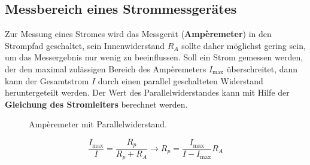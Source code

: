 \subsection{Messbereich eines Strommessgerätes}
Zur Messung eines Stromes wird das Messgerät (\textbf{Ampèremeter}) in den Strompfad geschaltet, sein Innenwiderstand $R_A$ sollte daher möglichst gering sein, um das Messergebnis nur wenig zu beeinflussen. Soll ein Strom gemessen werden, der den maximal zulässigen Bereich des Ampèremeters $I_{\text{max}}$ überschreitet, dann kann der Gesamtstrom $I$ durch einen parallel geschalteten Widerstand heruntergeteilt werden. Der Wert des Parallelwiderstandes kann mit Hilfe der \textbf{Gleichung des Stromleiters} berechnet werden.
\begin{figure}[H]
\centering
\caption{Ampèremeter mit Parallelwiderstand.}
\label{fig_IIIs}
\end{figure}
\begin{equation}
\boxed{\dfrac{I_{\text{max}}}{I}=\dfrac{R_p}{R_p+R_A}\longrightarrow R_p=\dfrac{I_{\text{max}}}{I-I_{\text{max}}}R_A}
\end{equation}
